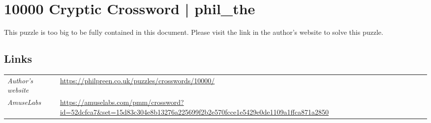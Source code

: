 \section[10000 Cryptic Crossword | phil\_the {[\emph{Cryptic Crossword}]}]{10000 Cryptic Crossword | {\normalfont phil\_the}}
\label{sec:16-10000-cryptic-crossword-phil-the}

This puzzle is too big to be fully contained in this document. Please visit the link in the author's website
to solve this puzzle.

\subsection*{Links}
\begin{tabularx}{\textwidth}{l X}
\emph{Author's website} & \url{https://philpreen.co.uk/puzzles/crosswords/10000/} \\
\emph{AmuseLabs} & \url{https://amuselabs.com/pmm/crossword?id=52dcfca7&set=15d83c304e8b13276a225699f2b2e570fcce1e5429e0de1109a1ffca871a2850} \\
\end{tabularx}
\pagebreak
